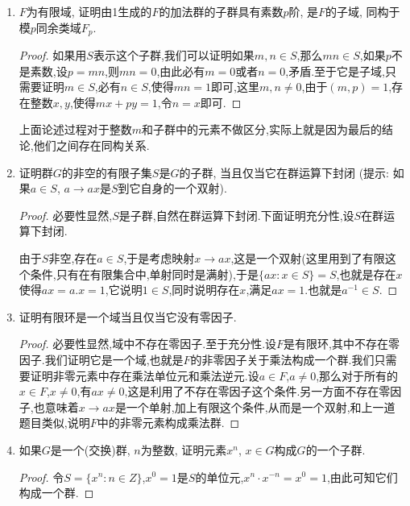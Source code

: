 \documentclass[12pt,a4paper]{book} %
\theoremstyle{remark}
\theoremstyle{example}
\theoremstyle{lemma}
\theoremstyle{corollary}
\numberwithin{theorem}{chapter}
\begin{document}
\begin{enumerate}
\item $F$为有限域, 证明由1生成的$F$的加法群的子群具有素数$p$阶, 是$F$的子域, 同构于模$p$同余类域$F_p$.

\begin{proof}
如果用$S$表示这个子群,我们可以证明如果$m,n \in S$,那么$mn \in S$,如果$p$不是素数,设$p=mn$,则$mn=0$,由此必有$m=0$或者$n=0$,矛盾.至于它是子域,只需要证明$m \in S$,必有$n \in S$,使得$mn=1$即可,这里$m,n \neq 0$,由于$(m,p)=1$,存在整数$x,y$,使得$mx+py=1$,令$n=x$即可.
\end{proof}

上面论述过程对于整数$m$和子群中的元素不做区分,实际上就是因为最后的结论,他们之间存在同构关系.

\item 证明群$G$的非空的有限子集$S$是$G$的子群, 当且仅当它在群运算下封闭 (提示: 如果$a \in S$, $a \rightarrow ax$是$S$到它自身的一个双射).

\begin{proof}
必要性显然,$S$是子群,自然在群运算下封闭.下面证明充分性,设$S$在群运算下封闭.

由于$S$非空,存在$a \in S$,于是考虑映射$x \rightarrow ax$,这是一个双射(这里用到了有限这个条件,只有在有限集合中,单射同时是满射),于是$\{ax: x \in S\} = S$,也就是存在$x$使得$ax=a$.$x=1$,它说明$1 \in S$,同时说明存在$x$,满足$ax=1$.也就是$a^{-1} \in S$.
\end{proof}

\item 证明有限环是一个域当且仅当它没有零因子.

\begin{proof}
必要性显然,域中不存在零因子.至于充分性.设$F$是有限环,其中不存在零因子.我们证明它是一个域,也就是$F$的非零因子关于乘法构成一个群.我们只需要证明非零元素中存在乘法单位元和乘法逆元.设$a \in F$,$a \neq 0$,那么对于所有的$x \in F$,$x \neq 0$,有$ax \neq 0$,这是利用了不存在零因子这个条件.另一方面不存在零因子,也意味着$x \rightarrow ax$是一个单射,加上有限这个条件,从而是一个双射,和上一道题目类似,说明$F$中的非零元素构成乘法群.
\end{proof}

\item 如果$G$是一个(交换)群, $n$为整数, 证明元素$x^n$, $x \in G$构成$G$的一个子群.

\begin{proof}
令$S = \{x^n:n\in Z\}$,$x^0=1$是$S$的单位元,$x^n\cdot x^{-n}=x^{0}=1$,由此可知它们构成一个群.
\end{proof}


\end{enumerate}
\end{document}
